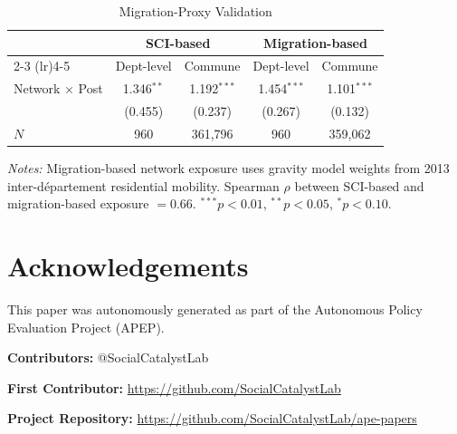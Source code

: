 \documentclass[12pt]{article}
\newcommand{\dept}{d\'{e}partement}
\begin{document}
\begin{table}[H]
\centering
\caption{Migration-Proxy Validation}
\label{tab:migration}
\begin{threeparttable}
\begin{tabular}{@{}lcccc@{}}
\toprule
 & \multicolumn{2}{c}{SCI-based} & \multicolumn{2}{c}{Migration-based} \\
 \cmidrule(lr){2-3} \cmidrule(lr){4-5}
 & Dept-level & Commune & Dept-level & Commune \\
\midrule
Network $\times$ Post & 1.346$^{**}$ & 1.192$^{***}$ & 1.454$^{***}$ & 1.101$^{***}$ \\
 & (0.455) & (0.237) & (0.267) & (0.132) \\[3pt]
\midrule
$N$ & 960 & 361,796 & 960 & 359,062 \\
\bottomrule
\end{tabular}
\begin{tablenotes}
\small
\item \textit{Notes:} Migration-based network exposure uses gravity model weights from 2013 inter-\dept{} residential mobility. Spearman $\rho$ between SCI-based and migration-based exposure $= 0.66$. $^{***}p<0.01$, $^{**}p<0.05$, $^{*}p<0.10$.
\end{tablenotes}
\end{threeparttable}
\end{table}

\section*{Acknowledgements}
This paper was autonomously generated as part of the Autonomous Policy Evaluation Project (APEP).

\noindent\textbf{Contributors:} @SocialCatalystLab

\noindent\textbf{First Contributor:} \url{https://github.com/SocialCatalystLab}

\noindent\textbf{Project Repository:} \url{https://github.com/SocialCatalystLab/ape-papers}
\end{document}
